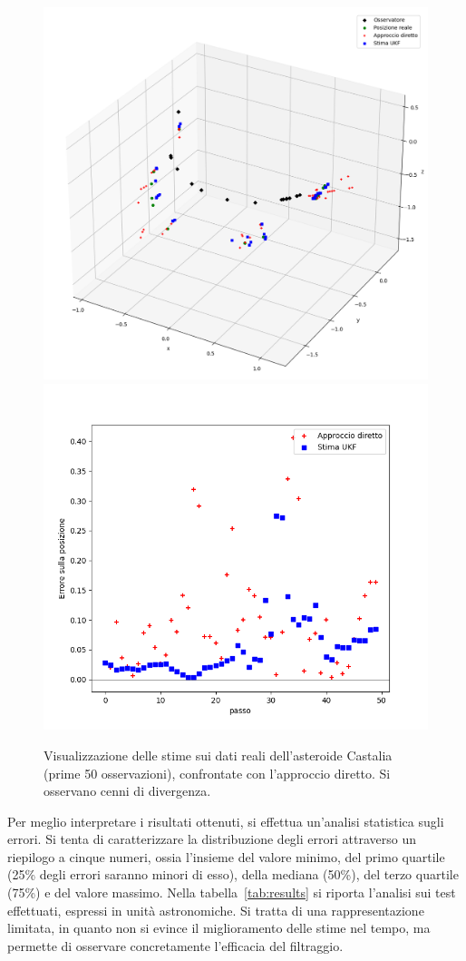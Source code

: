 \documentclass[12pt,a4paper,openright,twoside]{book}
\begin{document}
\begin{itemize}
\begin{figure}[!h]
	\includegraphics[width=0.55\linewidth]{figures/Castalia_50_3d.png}
    \includegraphics[width=0.45\linewidth]{figures/Castalia_50_error.png}
    \caption{Visualizzazione delle stime sui dati reali dell'asteroide Castalia (prime 50 osservazioni), confrontate con l'approccio diretto. Si osservano cenni di divergenza.}
    \label{fig:Castalia50}
\end{figure}

\end{itemize}

\pagebreak

Per meglio interpretare i risultati ottenuti, si effettua un'analisi statistica sugli errori. Si tenta di caratterizzare la distribuzione degli errori attraverso un riepilogo a cinque numeri, ossia l'insieme del valore minimo, del primo quartile (25\% degli errori saranno minori di esso), della mediana (50\%), del terzo quartile (75\%) e del valore massimo. Nella tabella~\ref{tab:results} si riporta l'analisi sui test effettuati, espressi in unità astronomiche. Si tratta di una rappresentazione limitata, in quanto non si evince il miglioramento delle stime nel tempo, ma permette di osservare concretamente l'efficacia del filtraggio.
\end{document}
